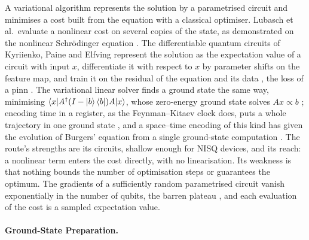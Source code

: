 A variational algorithm represents the solution by a parametrised circuit and minimises a cost built from the equation with a classical optimiser. Lubasch et al.\ evaluate a nonlinear cost on several copies of the state, as demonstrated on the nonlinear Schrödinger equation \cite{lubasch2020variational}. The differentiable quantum circuits of Kyriienko, Paine and Elfving represent the solution as the expectation value of a circuit with input $x$, differentiate it with respect to $x$ by parameter shifts on the feature map, and train it on the residual of the equation and its data \cite{kyriienko2021differentiable}, the loss of a \gls{pinn} \cite{raissi2019pinn}. The variational linear solver finds a ground state the same way, minimising $\braket{x|A^\dagger(I-\ket{b}\bra{b})A|x}$, whose zero-energy ground state solves $Ax\propto b$ \cite{bravoprieto2023vqls}; encoding time in a register, as the Feynman--Kitaev clock does, puts a whole trajectory in one ground state \cite{barison2022variational}, and a space--time encoding of this kind has given the evolution of Burgers' equation from a single ground-state computation \cite{pool2024nonlinear}. The route's strengths are its circuits, shallow enough for NISQ devices, and its reach: a nonlinear term enters the cost directly, with no linearisation. Its weakness is that nothing bounds the number of optimisation steps or guarantees the optimum. The gradients of a sufficiently random parametrised circuit vanish exponentially in the number of qubits, the barren plateau \cite{mcclean2018barren}, and each evaluation of the cost is a sampled expectation value.

\paragraph{Ground-State Preparation.}
\label{sec:bg-de-ground}

